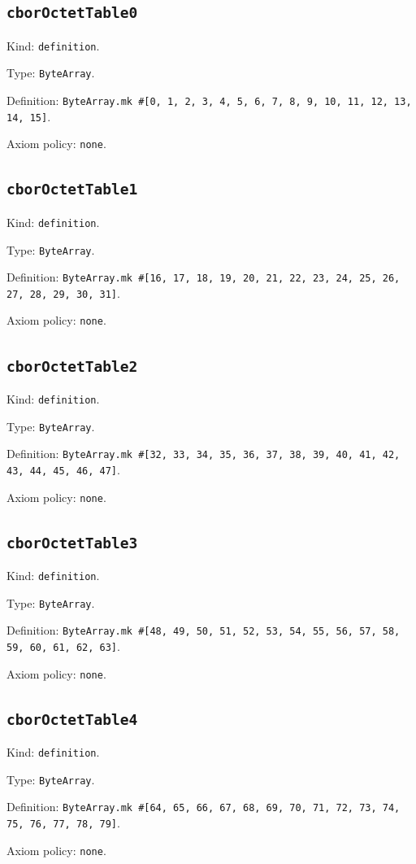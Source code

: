 \documentclass[11pt]{article}
\begin{document}
\subsection*{\texttt{cborOctetTable0}}
\noindent Kind: \texttt{definition}.\par
\noindent Type: \texttt{ByteArray}.\par
\noindent Definition: \texttt{ByteArray.mk \#[0, 1, 2, 3, 4, 5, 6, 7, 8, 9, 10, 11, 12, 13, 14, 15]}.\par
\noindent Axiom policy: \texttt{none}.\par
\subsection*{\texttt{cborOctetTable1}}
\noindent Kind: \texttt{definition}.\par
\noindent Type: \texttt{ByteArray}.\par
\noindent Definition: \texttt{ByteArray.mk \#[16, 17, 18, 19, 20, 21, 22, 23, 24, 25, 26, 27, 28, 29, 30, 31]}.\par
\noindent Axiom policy: \texttt{none}.\par
\subsection*{\texttt{cborOctetTable2}}
\noindent Kind: \texttt{definition}.\par
\noindent Type: \texttt{ByteArray}.\par
\noindent Definition: \texttt{ByteArray.mk \#[32, 33, 34, 35, 36, 37, 38, 39, 40, 41, 42, 43, 44, 45, 46, 47]}.\par
\noindent Axiom policy: \texttt{none}.\par
\subsection*{\texttt{cborOctetTable3}}
\noindent Kind: \texttt{definition}.\par
\noindent Type: \texttt{ByteArray}.\par
\noindent Definition: \texttt{ByteArray.mk \#[48, 49, 50, 51, 52, 53, 54, 55, 56, 57, 58, 59, 60, 61, 62, 63]}.\par
\noindent Axiom policy: \texttt{none}.\par
\subsection*{\texttt{cborOctetTable4}}
\noindent Kind: \texttt{definition}.\par
\noindent Type: \texttt{ByteArray}.\par
\noindent Definition: \texttt{ByteArray.mk \#[64, 65, 66, 67, 68, 69, 70, 71, 72, 73, 74, 75, 76, 77, 78, 79]}.\par
\noindent Axiom policy: \texttt{none}.\par
\end{document}
